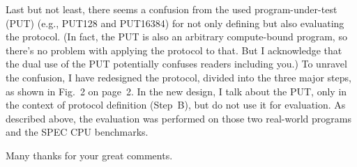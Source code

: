 \documentclass[10pt,letterpaper]{article}
\begin{document}
Last but not least, there seems a confusion from the used program-under-test (PUT) (e.g., PUT128 and PUT16384) 
for not only defining but also evaluating the protocol. (In fact, the PUT is also an arbitrary \hbox{compute-bound} program, 
so there's no problem with applying the protocol to that. But I acknowledge that the dual use of the PUT potentially confuses readers including you.)
To unravel the confusion, I have redesigned the protocol, divided into the three major steps, as shown in Fig.~2 on page~2. 
In the new design, I talk about the PUT, only in the context of protocol definition (Step~B), but do not use it for evaluation. 
As described above, the evaluation was performed on those two real-world programs and the SPEC CPU benchmarks.

Many thanks for your great comments.
\end{document}
